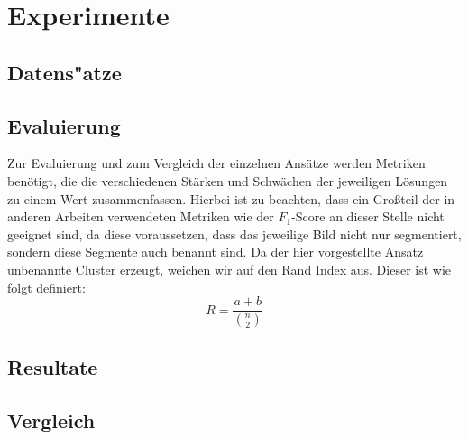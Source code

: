 \chapter{Experimente}
\label{chap:experimente}

\section{Datens"atze}
\label{sec:datensätze}

\section{Evaluierung}
\label{sec:evaluierung}

Zur Evaluierung und zum Vergleich der einzelnen Ansätze werden Metriken benötigt, die die verschiedenen Stärken und Schwächen der jeweiligen Lösungen zu einem Wert zusammenfassen. Hierbei ist zu beachten, dass ein Großteil der in anderen Arbeiten verwendeten Metriken wie \bspw der $F_1$-Score an dieser Stelle nicht geeignet sind, da diese voraussetzen, dass das jeweilige Bild nicht nur segmentiert, sondern diese Segmente auch benannt sind. Da der hier vorgestellte Ansatz unbenannte Cluster erzeugt, weichen wir auf den Rand Index\cite{randindex} aus. Dieser ist wie folgt definiert:
\[R=\frac{a+b}{\binom{n}{2}}\]


\section{Resultate}
\label{sec:resultate}

\section{Vergleich}
\label{sec:vergleich}